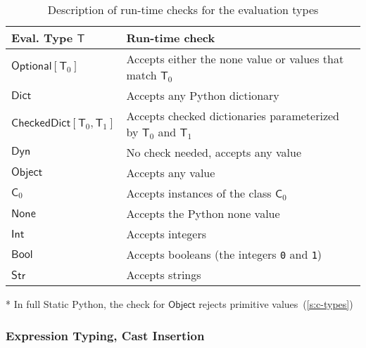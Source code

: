 \documentclass[english,cleveref,submission]{programming}
\newcommand{\SP}{Static Python}
\newcommand{\code}[1]{\texttt{#1}}
\newcommand{\typefont}[1]{\mathsf{#1}}
\newcommand{\paramtype}[2]{#1[#2]}
\newcommand{\spteval}{\typefont{T}}
\newcommand{\sptclass}{\typefont{C}}
\newcommand{\sptint}{\typefont{Int}}
\newcommand{\sptstr}{\typefont{Str}}
\newcommand{\sptbool}{\typefont{Bool}}
\newcommand{\sptdyn}{\typefont{Dyn}}
\newcommand{\sptobject}{\typefont{Object}}
\newcommand{\sptnone}{\typefont{None}}
\newcommand{\sptoptional}[1]{\paramtype{\typefont{Optional}}{#1}}
\newcommand{\sptrawpydict}{\typefont{Dict}}
\newcommand{\sptrawchkdict}{\typefont{CheckedDict}} %
\newcommand{\sptchkdict}[2]{\paramtype{\sptrawchkdict}{#1, #2}}
\begin{document}
\begin{table}[t]
  \begin{threeparttable}
  \centering
  \caption{Description of run-time checks for the evaluation types}
  \label{t:cast}

    \begin{tabular}{l@{\quad}l}
    {Eval. Type $\spteval$} & {Run-time check} \\\hline
    $\sptoptional{\spteval_0}$ & {Accepts either the none value or values that match $\spteval_0$} \\
    $\sptrawpydict$ & {Accepts any Python dictionary} \\
    $\sptchkdict{\spteval_0}{\spteval_1}$ & {Accepts checked dictionaries parameterized by $\spteval_0$ and $\spteval_1$} \\
    $\sptdyn$ & {No check needed, accepts any value} \\
    $\sptobject$ & {Accepts any value\tnote{*}} \\
    $\sptclass_0$ & {Accepts instances of the class $\sptclass_0$} \\
    $\sptnone$ & {Accepts the Python none value} \\
    $\sptint$ & {Accepts integers} \\
    $\sptbool$ & {Accepts booleans (the integers \code{0} and \code{1})} \\
    $\sptstr$ & {Accepts strings}
    \end{tabular}

    \begin{tablenotes}
    \item {*} {\footnotesize In full \SP{}, the check for $\sptobject$ rejects primitive values~(\cref{s:c-types})}
    \end{tablenotes}
\end{threeparttable}
\end{table}


\subsubsection{Expression Typing, Cast Insertion}
\end{document}
